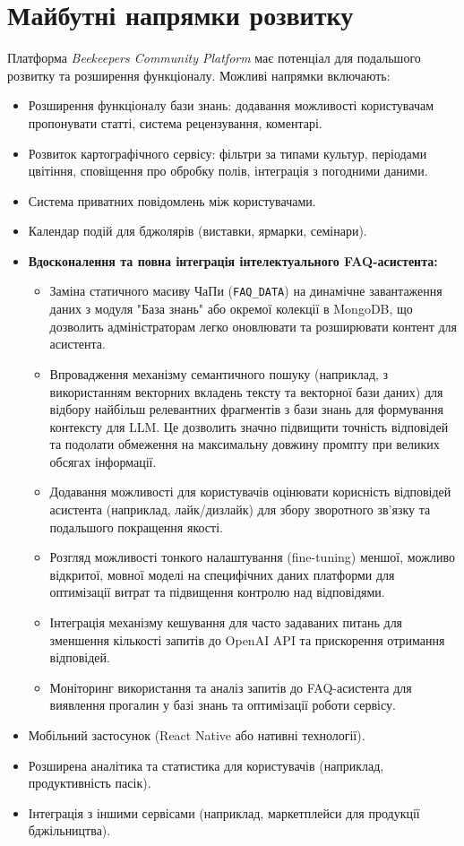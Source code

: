 \section{Майбутні напрямки розвитку}
\label{sec:future_work}
Платформа \textit{Beekeepers Community Platform} має потенціал для подальшого розвитку та розширення функціоналу. Можливі напрямки включають:
\begin{itemize}
    \item Розширення функціоналу бази знань: додавання можливості користувачам пропонувати статті, система рецензування, коментарі.
    \item Розвиток картографічного сервісу: фільтри за типами культур, періодами цвітіння, сповіщення про обробку полів, інтеграція з погодними даними.
    \item Система приватних повідомлень між користувачами.
    \item Календар подій для бджолярів (виставки, ярмарки, семінари).
    \item \textbf{Вдосконалення та повна інтеграція інтелектуального FAQ-асистента:}
        \begin{itemize}
            \item Заміна статичного масиву ЧаПи (\texttt{FAQ\_DATA}) на динамічне завантаження даних з модуля "База знань" або окремої колекції в MongoDB, що дозволить адміністраторам легко оновлювати та розширювати контент для асистента.
            \item Впровадження механізму семантичного пошуку (наприклад, з використанням векторних вкладень тексту та векторної бази даних) для відбору найбільш релевантних фрагментів з бази знань для формування контексту для LLM. Це дозволить значно підвищити точність відповідей та подолати обмеження на максимальну довжину промпту при великих обсягах інформації.
            \item Додавання можливості для користувачів оцінювати корисність відповідей асистента (наприклад, лайк/дизлайк) для збору зворотного зв'язку та подальшого покращення якості.
            \item Розгляд можливості тонкого налаштування (fine-tuning) меншої, можливо відкритої, мовної моделі на специфічних даних платформи для оптимізації витрат та підвищення контролю над відповідями.
            \item Інтеграція механізму кешування для часто задаваних питань для зменшення кількості запитів до OpenAI API та прискорення отримання відповідей.
            \item Моніторинг використання та аналіз запитів до FAQ-асистента для виявлення прогалин у базі знань та оптимізації роботи сервісу.
        \end{itemize}
    \item Мобільний застосунок (React Native або нативні технології).
    \item Розширена аналітика та статистика для користувачів (наприклад, продуктивність пасік).
    \item Інтеграція з іншими сервісами (наприклад, маркетплейси для продукції бджільництва).
\end{itemize} 